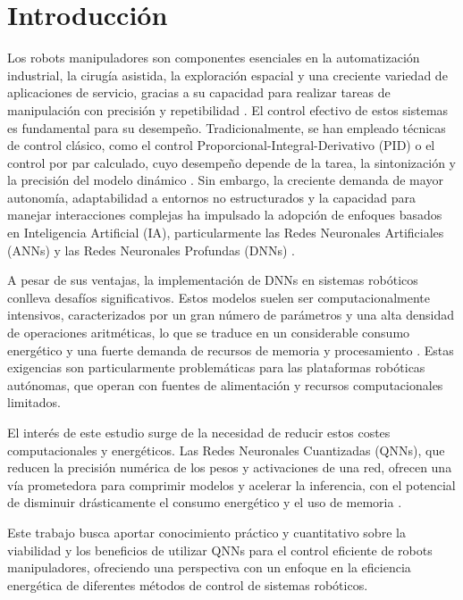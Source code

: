 \documentclass[12pt]{article}
\begin{document}
\section*{Introducción}
\label{sec:introduccion}
Los robots manipuladores son componentes esenciales en la automatización industrial, la cirugía asistida, la exploración espacial y una creciente variedad de aplicaciones de servicio, gracias a su capacidad para realizar tareas de manipulación con precisión y repetibilidad \cite{modern_robotics}. El control efectivo de estos sistemas es fundamental para su desempeño. Tradicionalmente, se han empleado técnicas de control clásico, como el control Proporcional-Integral-Derivativo (PID) o el control por par calculado, cuyo desempeño depende de la tarea, la sintonización y la precisión del modelo dinámico \cite{modern_robotics}. Sin embargo, la creciente demanda de mayor autonomía, adaptabilidad a entornos no estructurados y la capacidad para manejar interacciones complejas ha impulsado la adopción de enfoques basados en Inteligencia Artificial (IA), particularmente las Redes Neuronales Artificiales (ANNs) y las Redes Neuronales Profundas (DNNs) \cite{JuarezLora2024Thesis, Park2025electronics}.

A pesar de sus ventajas, la implementación de DNNs en sistemas robóticos conlleva desafíos significativos. Estos modelos suelen ser computacionalmente intensivos, caracterizados por un gran número de parámetros y una alta densidad de operaciones aritméticas, lo que se traduce en un considerable consumo energético y una fuerte demanda de recursos de memoria y procesamiento \cite{Chen2021memristor, Liang2021PruningSurvey}. Estas exigencias son particularmente problemáticas para las plataformas robóticas autónomas, que operan con fuentes de alimentación y recursos computacionales limitados\cite{Bartolozzi2022embodied, deVriesGao2025AIenergy}.

El interés de este estudio surge de la necesidad de reducir estos costes computacionales y energéticos. Las Redes Neuronales Cuantizadas (QNNs), que reducen la precisión numérica de los pesos y activaciones de una red, ofrecen una vía prometedora para comprimir modelos y acelerar la inferencia, con el potencial de disminuir drásticamente el consumo energético y el uso de memoria \cite{Liang2021PruningSurvey, ZhangL2025FLQ}.

Este trabajo busca aportar conocimiento práctico y cuantitativo sobre la viabilidad y los beneficios de utilizar QNNs para el control eficiente de robots manipuladores, ofreciendo una perspectiva con un enfoque en la eficiencia energética de diferentes métodos de control de sistemas robóticos.
\end{document}

